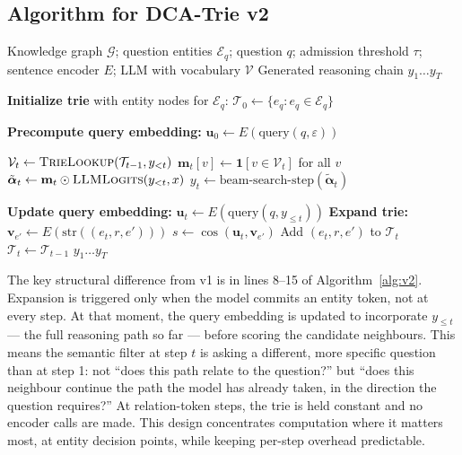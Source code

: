 \newpage

\subsection{Algorithm for DCA-Trie v2}

\begin{algorithm}[H]
  \caption{DCA-Trie v2: Step-Wise Semantic Expansion}
  \label{alg:v2}
  \small
  \begin{algorithmic}[1]
    \Require Knowledge graph $\mathcal{G}$; question entities $\mathcal{E}_q$;
    question $q$; admission threshold $\tau$; sentence encoder $E$;
    LLM with vocabulary $\mathcal{V}$
    \Ensure Generated reasoning chain $y_1 \ldots y_T$

    \State \textbf{Initialize trie} with entity nodes for $\mathcal{E}_q$:
    $\mathcal{T}_0 \gets \{e_q : e_q \in \mathcal{E}_q\}$

    \State \textbf{Precompute query embedding:}
    $\mathbf{u}_0 \gets E(\text{query}(q, \varepsilon))$

    \State $\mathcal{V}_t \gets \textsc{TrieLookup}(\mathcal{T}_{t-1}, y_{<t})$
    \State $\mathbf{m}_t[v] \gets \mathbf{1}[v \in \mathcal{V}_t]$ for all $v$
    \State $\tilde{\boldsymbol{\alpha}}_t \gets \mathbf{m}_t \odot
      \textsc{LLMLogits}(y_{<t}, x)$
    \State $y_t \gets \text{beam-search-step}(\tilde{\boldsymbol{\alpha}}_t)$

    \State \textbf{Update query embedding:}
    $\mathbf{u}_t \gets E(\text{query}(q, y_{\leq t}))$
    \State \textbf{Expand trie:}
    \State $\mathbf{v}_{e'} \gets E(\text{str}((e_t, r, e')))$
    \State $s \gets \cos(\mathbf{u}_t, \mathbf{v}_{e'})$
    \State Add $(e_t, r, e')$ to $\mathcal{T}_t$
    \EndIf
    \EndFor
    \Else
    \State $\mathcal{T}_t \gets \mathcal{T}_{t-1}$
    \EndIf
    \EndFor
    \State \Return $y_1 \ldots y_T$
  \end{algorithmic}
\end{algorithm}

The key structural difference from v1 is in lines 8--15 of Algorithm~\ref{alg:v2}. Expansion is triggered only when the model commits an entity token, not at every step. At that moment, the query embedding is updated to incorporate $y_{\leq t}$ — the full reasoning path so far — before scoring the candidate neighbours. This means the semantic filter at step $t$ is asking a different, more specific question than at step 1: not ``does this path relate to the question?'' but ``does this neighbour continue the path the model has already taken, in the direction the question requires?'' At relation-token steps, the trie is held constant and no encoder calls are made. This design concentrates computation where it matters most, at entity decision points, while keeping per-step overhead predictable.

